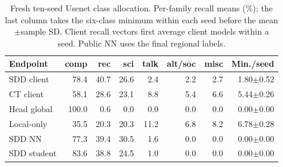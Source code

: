 \begin{table}[t]
\caption{Fresh ten-seed Usenet class allocation. Per-family recall means (\%); the last column takes the six-class minimum within each seed before the mean$\pm$sample SD. Client recall vectors first average client models within a seed. Public NN uses the final regional labels.}
\label{tab:web-new-recall}\small
\centering
\begin{tabular}{@{}lrrrrrrr@{}}\toprule
Endpoint & comp & rec & sci & talk & alt/soc & misc & Min./seed \\
\midrule
SDD client & 78.4 & 40.7 & 26.6 & 2.4 & 2.2 & 2.7 & 1.80$\pm$0.52 \\
CT client & 58.1 & 28.6 & 23.1 & 8.8 & 5.4 & 6.6 & 5.44$\pm$0.26 \\
Head global & 100.0 & 0.6 & 0.0 & 0.0 & 0.0 & 0.0 & 0.00$\pm$0.00 \\
Local-only & 35.5 & 20.3 & 20.3 & 11.2 & 6.8 & 8.2 & 6.78$\pm$0.28 \\
SDD NN & 77.3 & 39.4 & 30.5 & 1.6 & 0.0 & 0.0 & 0.00$\pm$0.00 \\
SDD student & 83.6 & 38.8 & 24.5 & 1.0 & 0.0 & 0.0 & 0.00$\pm$0.00 \\
\bottomrule\end{tabular}
\end{table}

